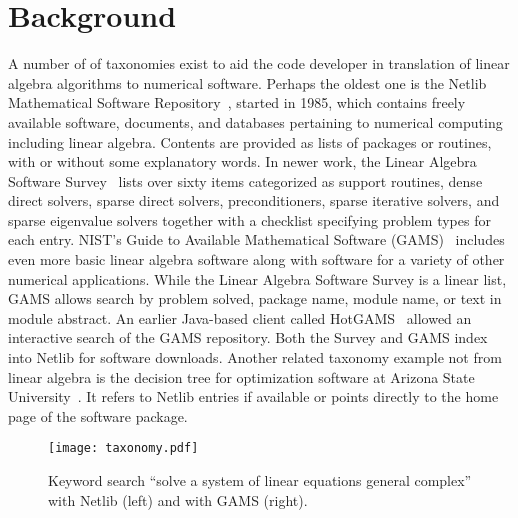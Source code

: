 \documentclass{sig-alternate}
\begin{document}
\section{Background}
\label{sec:background}


A number of of 
taxonomies exist to aid the code developer in translation of linear algebra 
algorithms to numerical software.  Perhaps the oldest one is the Netlib 
Mathematical Software Repository~\cite{blas:Online}, started in 1985, which 
contains freely available software, documents, and databases pertaining to 
numerical computing including linear algebra.  Contents are provided as 
lists of packages or routines, with or without some explanatory words.  
In newer work, the Linear Algebra Software 
Survey~\cite{SoftwareSurvey} lists over sixty items categorized as support 
routines, dense direct solvers, sparse direct solvers, preconditioners, 
sparse iterative solvers, and sparse eigenvalue solvers together with a 
checklist specifying problem types for each entry.   NIST's Guide to 
Available Mathematical Software (GAMS)~\cite{GAMS} includes even more basic 
linear 
algebra software along with software for a variety of other numerical 
applications.   While the Linear Algebra Software Survey is a linear list, 
GAMS allows search by problem solved, package name, module name, or text in 
module abstract.   
An earlier Java-based client called HotGAMS~\cite{HotGAMS} 
allowed an interactive search of the GAMS repository.  
Both the Survey and GAMS index into Netlib for 
software downloads.   
Another related taxonomy example not from linear algebra is the decision tree for 
optimization 
software at Arizona State University~\cite{optimization-decision-tree}. It 
refers to Netlib entries if available or points directly to the home page of the 
software package. 




 \begin{figure*}
\center
\texttt{[image: taxonomy.pdf]}
\vspace{-15pt}
\caption{Keyword search ``solve a system of linear equations general complex'' with Netlib (left) and with GAMS (right).}
\label{fig:taxonomy}
\end{figure*}
\end{document}
